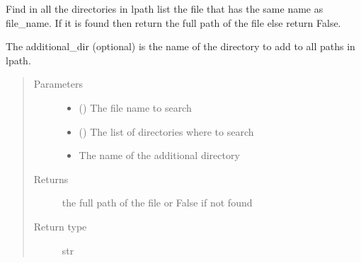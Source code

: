 \documentclass[a4paper,10pt,english]{sphinxmanual}
\begin{document}
\begin{fulllineitems}
\label{\detokenize{commands/apidoc/src:src.find_file_in_lpath}}
Find in all the directories in lpath list the file that has the same name
as file\_name. 
If it is found 
then return the full path of the file
else return False.

The additional\_dir (optional) is the name of the directory to add to all 
paths in lpath.
\begin{quote}\begin{description}
\item[{Parameters}] \leavevmode\begin{itemize}
\item {} 
 () \textendash{} The file name to search

\item {} 
 () \textendash{} The list of directories where to search

\item {} 
 \textendash{} The name of the additional directory

\end{itemize}

\item[{Returns}] \leavevmode
the full path of the file or False if not found

\item[{Return type}] \leavevmode
str

\end{description}\end{quote}

\end{fulllineitems}

\end{document}
